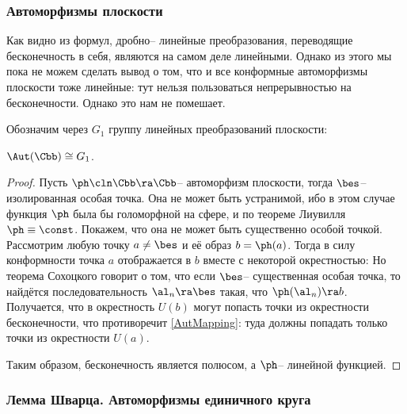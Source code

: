 \documentclass[a4paper]{article}
\begin{document}
\subsubsection{Автоморфизмы плоскости}

Как видно из формул, дробно-- линейные преобразования, переводящие бесконечность в себя, являются
на самом деле линейными. Однако из этого мы пока не можем сделать вывод о том, что и все конформные автоморфизмы
плоскости тоже линейные: тут нельзя пользоваться непрерывностью на бесконечности. Однако это нам не помешает.

Обозначим через $G_1$ группу линейных преобразований плоскости:

\begin{theorem}
$\Aut(\Cbb)\cong G_1$.
\end{theorem}
\begin{proof}
Пусть $\ph\cln\Cbb\ra\Cbb$-- автоморфизм плоскости, тогда $\bes$-- изолированная особая точка. Она не может
быть устранимой, ибо в этом случае функция $\ph$ была бы голоморфной на  сфере, и по теореме Лиувилля $\ph\equiv\const$.
Покажем, что она не может быть существенно особой точкой. Рассмотрим любую точку $a \neq \bes$ и её образ $b=\ph(a)$.
Тогда в силу конформности точка $a$ отображается в $b$ вместе с некоторой окрестностью:
Но теорема Сохоцкого говорит о том, что если $\bes$-- существенная особая точка, то найдётся последовательность $\al_n \ra \bes$
такая, что $\ph(\al_n) \ra b$. Получается, что в окрестность $U(b)$ могут попасть точки из окрестности бесконечности, что
противоречит \eqref{AutMapping}: туда должны попадать только точки из окрестности $U(a)$.

Таким образом, бесконечность является полюсом, а $\ph$-- линейной функцией.
\end{proof}

\subsubsection{Лемма Шварца. Автоморфизмы единичного круга}
\end{document}
